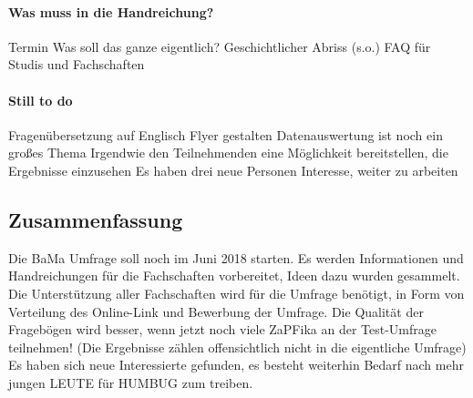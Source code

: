       \paragraph{Was muss in die Handreichung?}
        \begin{outline}
          \1 Termin
          \1 Was soll das ganze eigentlich?
          \1 Geschichtlicher Abriss (s.o.)
          \1 FAQ für Studis und Fachschaften
        \end{outline}

      \paragraph{Still to do}
        \begin{outline}
          \1 Fragenübersetzung auf Englisch
          \1 Flyer gestalten
          \1 Datenauswertung ist noch ein großes Thema
            \2 Irgendwie den Teilnehmenden eine Möglichkeit bereitstellen, die Ergebnisse einzusehen
          \1 Es haben drei neue Personen Interesse, weiter zu arbeiten
        \end{outline}

  \subsection*{Zusammenfassung}
    \begin{outline}
      \1 Die BaMa Umfrage soll noch im Juni 2018 starten.
      \1 Es werden Informationen und Handreichungen für die Fachschaften vorbereitet, Ideen dazu wurden gesammelt.
      \1 Die Unterstützung aller Fachschaften wird für die Umfrage benötigt, in Form von Verteilung des Online-Link und Bewerbung der Umfrage.
      \1 Die Qualität der Fragebögen wird besser, wenn jetzt noch viele ZaPFika an der Test-Umfrage teilnehmen! (Die Ergebnisse zählen offensichtlich nicht in die eigentliche Umfrage)
      \1 Es haben sich neue Interessierte gefunden, es besteht weiterhin Bedarf nach mehr jungen LEUTE für HUMBUG zum treiben.
    \end{outline}
